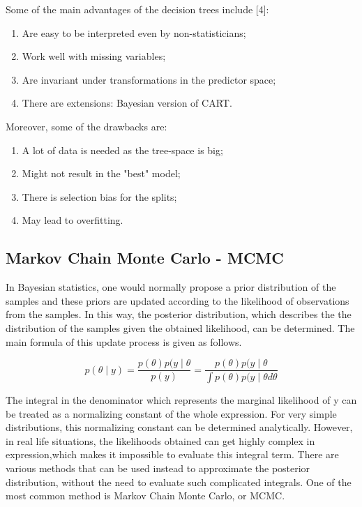 \documentclass{usiinftr}
\begin{document}
Some of the main advantages of the decision trees include [4]:
\begin{enumerate}
\item Are easy to be interpreted even by non-statisticians;
\item Work well with missing variables;
\item Are invariant under transformations in the predictor space;
\item There are extensions: Bayesian version of CART.
\end{enumerate}

Moreover, some of the drawbacks are:
\begin{enumerate}
\item A lot of data is needed as the tree-space is big;
\item Might not result in the "best" model;
\item There is selection bias for the splits;
\item May lead to overfitting.
\end{enumerate}

\subsection{Markov Chain Monte Carlo - MCMC}
In Bayesian statistics, one would normally propose a prior distribution of the samples and these priors are updated according to the likelihood of observations from the samples. In this way, the posterior distribution, which describes the the distribution of the samples given the obtained likelihood, can be determined. The main formula of this update process is given as follows.

\begin{equation} \label{Bayes}
p(\theta \mid y) = \frac{p(\theta)p(y \mid \theta}{p(y)} = \frac{p(\theta)p(y \mid \theta}{\int p(\theta)p(y \mid \theta d\theta}
\end{equation}

The integral in the denominator which represents the marginal likelihood of y can be treated as a normalizing constant of the whole expression. For very simple distributions, this normalizing constant can be determined analytically. However, in real life situations, the likelihoods obtained can get highly complex in expression,which makes it impossible to evaluate this integral term. There are various methods that can be used instead to approximate the posterior distribution, without the need to evaluate such complicated integrals. One of the most common method is Markov Chain Monte Carlo, or MCMC.
\end{document}

